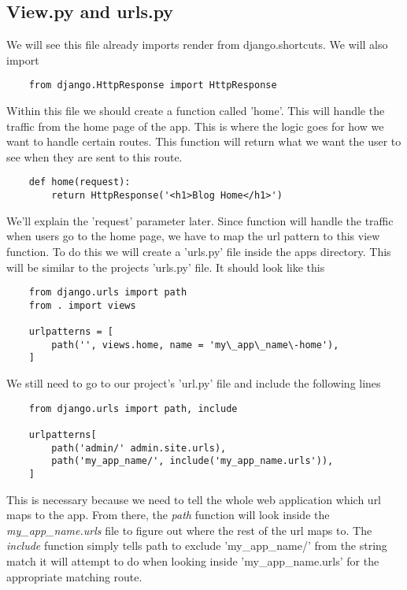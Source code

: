 \documentclass{article}%
\begin{document}
\subsection{View.py and urls.py}
We will see this file already imports render from django.shortcuts. We will also import 
\begin{lstlisting}
    from django.HttpResponse import HttpResponse
\end{lstlisting}
Within this file we should create a function called 'home'. This will handle the traffic from the home page of the app. This is where the logic goes for how we want to handle certain routes. This function will return what we want the user to see when they are sent to this route.
\begin{lstlisting}
    def home(request):
        return HttpResponse('<h1>Blog Home</h1>')
\end{lstlisting}
We'll explain the 'request' parameter later. Since function will handle the traffic when users go to the home page, we have to map the url pattern to this view function. To do this we will create a 'urls.py' file inside the apps directory. This will be similar to the projects 'urls.py' file. It should look like this
\begin{lstlisting}
    from django.urls import path
    from . import views

    urlpatterns = [
        path('', views.home, name = 'my\_app\_name\-home'),
    ]
\end{lstlisting}
We still need to go to our project's 'url.py' file and include the following lines 
\begin{lstlisting}
    from django.urls import path, include

    urlpatterns[
        path('admin/' admin.site.urls),
        path('my_app_name/', include('my_app_name.urls')),
    ]
\end{lstlisting}
This is necessary because we need to tell the whole web application which url maps to the app. From there, the \textit{path} function will look inside the \textit{my\_app\_name.urls} file to figure out where the
rest of the url maps to. The \textit{include} function simply tells path to exclude 'my\_app\_name/' from the string match it will attempt to do when looking inside 'my\_app\_name.urls' for the appropriate matching route. \\ \\
\end{document}
